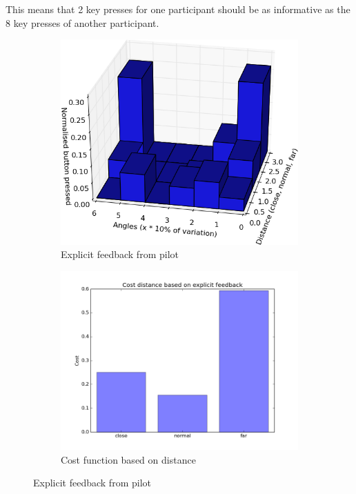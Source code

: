 \documentclass[a4paper,11pt]{report}
\begin{document}
This means that 2 key presses for one participant should be as informative as the 8 key presses of another participant.
\begin{figure}
    \centering
    \begin{subfigure}[b]{0.45\textwidth}
        \includegraphics[width=\textwidth]{figures/key_presses_normalised_cropped.png}
        \caption{Explicit feedback from pilot}
        \label{fig:button_presses}
    \end{subfigure}
    \begin{subfigure}[b]{0.45\textwidth}
        \includegraphics[width=\textwidth]{figures/Distance_cost.png}
        \caption{Cost function based on distance}
        \label{fig:distance_cost}
    \end{subfigure}
    \caption{Explicit feedback from pilot}
    \label{fig:button_presses_cost}
\end{figure}
\end{document}

